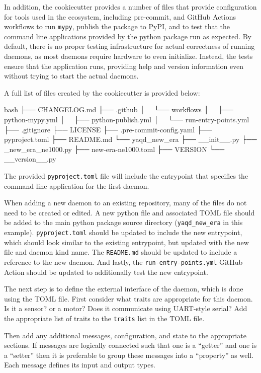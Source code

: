 In addition, the cookiecutter provides a number of files that provide configuration for tools used in the \yaq{} ecosystem, including pre-commit\cite{pre-commit}, and GitHub Actions\cite{githubactions} workflows to run \texttt{mypy}\cite{mypy}, publish the package to PyPI\cite{PyPI}, and to test that the command line applications provided by the python package run as expected.
By default, there is no proper testing infrastructure for actual correctness of running daemons, as most daemons require hardware to even initialize.
Instead, the tests ensure that the application runs, providing help and version information even without trying to start the actual daemons.

A full list of files created by the cookiecutter is provided below:

\begin{codefragment}{bash}
├── CHANGELOG.md
├── .github
│   └── workflows
│       ├── python-mypy.yml
│       ├── python-publish.yml
│       └── run-entry-points.yml
├── .gitignore
├── LICENSE
├── .pre-commit-config.yaml
├── pyproject.toml
├── README.md
└── yaqd_new_era
    ├── __init__.py
    ├── _new_era_ne1000.py
    ├── new-era-ne1000.toml
    ├── VERSION
    └── __version__.py
\end{codefragment}

The provided \texttt{pyproject.toml} file will include the entrypoint that specifies the command line application for the first daemon.


When adding a new daemon to an existing repository, many of the files do not need to be created or edited.
A new python file and associated TOML file should be added to the main python package source directory (\texttt{yaqd\_new\_era} in this example).
\texttt{pyproject.toml} should be updated to include the new entrypoint, which should look similar to the existing entrypoint, but updated with the new file and daemon kind name.
The \texttt{README.md} should be updated to include a reference to the new daemon.
And lastly, the \texttt{run-entry-points.yml} GitHub Action should be updated to additionally test the new entrypoint.

The next step is to define the external interface of the daemon, which is done using the TOML file.
First consider what traits are appropriate for this daemon.
Is it a sensor? or a motor?
Does it communicate using UART-style serial?
Add the appropriate list of traits to the \texttt{traits} list in the TOML file.

Then add any additional messages, configuration, and state to the appropriate sections.
If messages are logically connected such that one is a ``getter'' and one is a ``setter'' then it is preferable to group these messages into a ``property'' as well.
Each message defines its input and output types.

